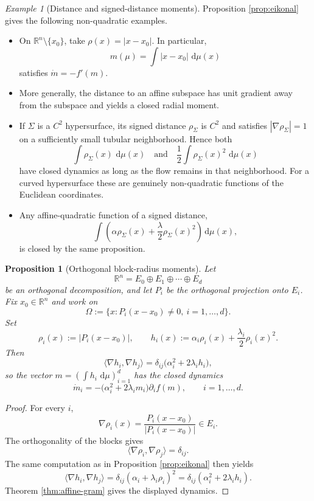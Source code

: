 \documentclass[11pt]{article}
\newcommand{\R}{\mathbb R}
\newcommand{\dd}{\,\mathrm d}
\newtheorem{proposition}{Proposition}
\theoremstyle{remark}
\newtheorem{example}{Example}
\begin{document}
\begin{example}[Distance and signed-distance moments]
Proposition \ref{prop:eikonal} gives the following non-quadratic examples.
\begin{itemize}
  \item On \(\R^n\setminus\{x_0\}\), take
  \(\rho(x)=|x-x_0|\).  In particular,
  \[
    m(\mu)=\int|x-x_0|\,\dd\mu(x)
  \]
  satisfies \(\dot m=-f'(m)\).

  \item More generally, the distance to an affine subspace has unit gradient
  away from the subspace and yields a closed radial moment.

  \item If \(\Sigma\) is a \(C^2\) hypersurface, its signed distance
  \(\rho_\Sigma\) is \(C^2\) and satisfies
  \(|\nabla\rho_\Sigma|=1\) on a sufficiently small tubular neighborhood.
  Hence both
  \[
    \int\rho_\Sigma(x)\,\dd\mu(x)
    \quad\text{and}\quad
    \frac12\int\rho_\Sigma(x)^2\,\dd\mu(x)
  \]
  have closed dynamics as long as the flow remains in that neighborhood.
  For a curved hypersurface these are genuinely non-quadratic functions of
  the Euclidean coordinates.

  \item Any affine-quadratic function of a signed distance,
  \[
    \int
    \left(
      \alpha\rho_\Sigma(x)
      +\frac{\lambda}{2}\rho_\Sigma(x)^2
    \right)\dd\mu(x),
  \]
  is closed by the same proposition.
\end{itemize}
\end{example}

\begin{proposition}[Orthogonal block-radius moments]
\label{prop:block-radius}
Let
\[
  \R^n=E_0\oplus E_1\oplus\cdots\oplus E_d
\]
be an orthogonal decomposition, and let \(P_i\) be the orthogonal projection
onto \(E_i\).  Fix \(x_0\in\R^n\) and work on
\[
  \Omega
  :=
  \{x:P_i(x-x_0)\neq0,\ i=1,\ldots,d\}.
\]
Set
\[
  \rho_i(x):=|P_i(x-x_0)|,
  \qquad
  h_i(x)
  :=
  \alpha_i\rho_i(x)+\frac{\lambda_i}{2}\rho_i(x)^2.
\]
Then
\[
  \langle\nabla h_i,\nabla h_j\rangle
  =
  \delta_{ij}\bigl(\alpha_i^2+2\lambda_i h_i\bigr),
\]
so the vector \(m=(\int h_i\,\dd\mu)_{i=1}^d\) has the closed dynamics
\[
  \boxed{
  \dot m_i
  =
  -\bigl(\alpha_i^2+2\lambda_i m_i\bigr)\partial_i f(m),
  \qquad i=1,\ldots,d.
  }
\]
\end{proposition}

\begin{proof}
For every \(i\),
\[
  \nabla\rho_i(x)
  =
  \frac{P_i(x-x_0)}{|P_i(x-x_0)|}\in E_i.
\]
The orthogonality of the blocks gives
\[
  \langle\nabla\rho_i,\nabla\rho_j\rangle=\delta_{ij}.
\]
The same computation as in Proposition \ref{prop:eikonal} then yields
\[
  \langle\nabla h_i,\nabla h_j\rangle
  =
  \delta_{ij}(\alpha_i+\lambda_i\rho_i)^2
  =
  \delta_{ij}(\alpha_i^2+2\lambda_i h_i).
\]
Theorem \ref{thm:affine-gram} gives the displayed dynamics.
\end{proof}
\end{document}

